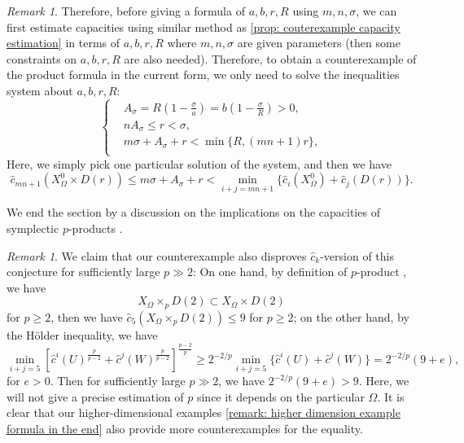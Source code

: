 \documentclass[11pt]{amsart}
\numberwithin{equation}{section}
\theoremstyle{plain}
\theoremstyle{definition}
\theoremstyle{remark}
\newtheorem{RMK}[rmk]{Remark}
\begin{document}
\begin{RMK}
Therefore, before giving a formula of $a,b,r,R$ using $m,n,\sigma$, we can first estimate capacities using similar method as \autoref{prop: couterexample capacity estimation} in terms of $a,b,r,R$ where $m,n,\sigma$ are given parameters (then some constraints on $a,b,r,R$ are also needed). Therefore, to obtain a counterexample of the product formula in the current form, we only need to solve the inequalities system about $a,b,r,R$:
\begin{equation}\label{equation: inequality system for counterexample}
    \begin{cases}
&A_\sigma =  R\left(1-\frac{\sigma}{a}\right)
=b\left(1-\frac{\sigma}{R}\right)>0,\\
&nA_\sigma\leq r<\sigma,\\
& m\sigma+A_\sigma+r
<\min\{R,(mn+1)r\},\\
    \end{cases}
\end{equation}
Here, we simply pick one particular solution of the system, and then we have
\[
\widehat{c}_{mn+1}(X_\Omega^0\times D(r))
\leq m\sigma+A_\sigma+r
< 
\min_{i+j=mn+1}
\{
\widehat{c}_i(X_\Omega^0)+\widehat{c}_j(D(r))
\}.
\]




\end{RMK}

We end the section by a discussion on the implications on the capacities of symplectic $p$-products \cite[Conjecture 1.6]{HaimKislevOstrover2023}.

\begin{RMK}\label{rmk: HaimKislevOstrover}
We claim that our counterexample also disproves $\widehat{c}_k$-version of this conjecture for sufficiently large $p\gg 2$: On one hand, by definition of $p$-product \cite[Conjecture 1.6]{HaimKislevOstrover2023}, we have
\[X_\Omega\times_p D(2) \subset  X_\Omega \times D(2)\]
for $p\geq2$, then we have $\widehat{c}_5(X_\Omega \times_p D(2)) \leq 9$ for $p\geq 2$; on the other hand, by the H\"older inequality, we have
\[\min_{ i+j=5} 
\left[
\widehat{c}^i(U)^{\frac{p}{p-2}}
+
\widehat{c}^j(W)^{\frac{p}{p-2}}
\right]^{\frac{p-2}{p}}\geq 2^{-2/p} \min_{ i+j=5} 
\{
\widehat{c}^i(U) 
+
\widehat{c}^j(W) 
\}= 2^{-2/p}(9+e),\]
for $e>0$. Then for sufficiently large $p\gg 2$, we have $2^{-2/p}(9+e)>9$. Here, we will not give a precise estimation of $p$ since it depends on the particular $\Omega$. It is clear that our higher-dimensional examples \autoref{remark: higher dimension example formula in the end} also provide more counterexamples for the equality.
\end{RMK}
\end{document}
